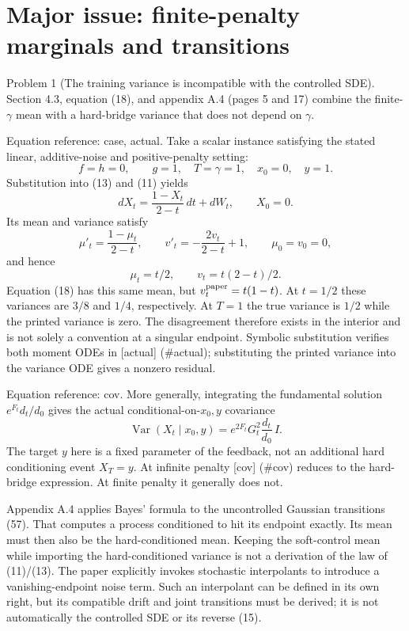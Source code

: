 \documentclass[10pt]{article}
\begin{document}
\section*{Major issue: finite-penalty marginals and transitions}
Problem 1 (The training variance is incompatible with the controlled SDE).  Section 4.3, equation (18), and appendix A.4 (pages 5 and 17) combine the finite-\(\gamma\) mean with a hard-bridge variance that does not depend on \(\gamma\).\par
Equation reference: case, actual. Take a scalar instance satisfying the stated linear, additive-noise and positive-penalty setting: \[
 f=h=0,\qquad g=1,\quad T=\gamma=1,\quad x_0=0,\quad y=1.\] Substitution into (13) and (11) yields \[dX_t=\frac{1-X_t}{2-t}\,dt+dW_t,\qquad X_0=0.\] Its mean and variance satisfy \[\mu'_t=\frac{1-\mu_t}{2-t},\qquad
 v'_t=-\frac{2v_t}{2-t}+1,\qquad \mu_0=v_0=0,\] and hence \[
 \mu_t=t/2,\qquad v_t=t(2-t)/2.\] Equation (18) has this same mean, but \(v_t^{\rm paper}=t(1-t)\). At \(t=1/2\) these variances are \(3/8\) and \(1/4\), respectively. At \(T=1\) the true variance is \(1/2\) while the printed variance is zero. The disagreement therefore exists in the interior and is not solely a convention at a singular endpoint. Symbolic substitution verifies both moment ODEs in [actual] (\#actual); substituting the printed variance into the variance ODE gives a nonzero residual.\par
Equation reference: cov. More generally, integrating the fundamental solution \(e^{F_t}d_t/d_0\) gives the actual conditional-on-\(x_0,y\) covariance \[
 \operatorname{Var}(X_t\mid x_0,y)
 =e^{2F_t}G_t^2\frac{d_t}{d_0}\,I.\] The target \(y\) here is a fixed parameter of the feedback, not an additional hard conditioning event \(X_T=y\). At infinite penalty [cov] (\#cov) reduces to the hard-bridge expression. At finite penalty it generally does not.\par
Appendix A.4 applies Bayes’ formula to the uncontrolled Gaussian transitions (57). That computes a process conditioned to hit its endpoint exactly. Its mean must then also be the hard-conditioned mean. Keeping the soft-control mean while importing the hard-conditioned variance is not a derivation of the law of (11)/(13). The paper explicitly invokes stochastic interpolants to introduce a vanishing-endpoint noise term. Such an interpolant can be defined in its own right, but its compatible drift and joint transitions must be derived; it is not automatically the controlled SDE or its reverse (15).\par
\end{document}
